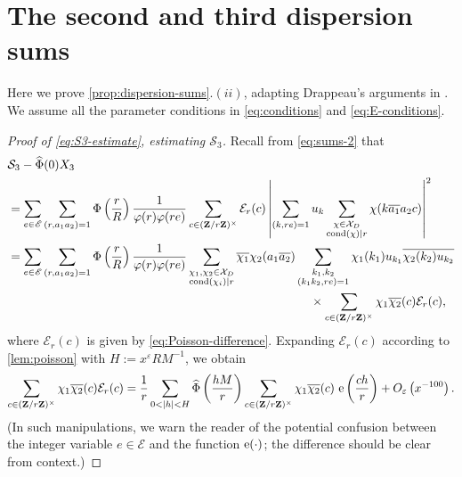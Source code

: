 \documentclass[reqno,11pt]{amsart}
\theoremstyle{definition}
\theoremstyle{remark}
\numberwithin{equation}{section}
\newcommand{\Z}{\mathbf{Z}}
\newcommand{\msE}{\mathscr{E}}
\newcommand{\mE}{\mathcal{E}}
\newcommand{\mS}{\mathcal{S}}
\newcommand{\mX}{\mathcal{X}}
\newcommand{\e}{\textnormal{e}}
\newcommand{\eps}{\varepsilon}
\renewcommand{\bar}{\overline}
\renewcommand{\hat}{\widehat}
\newcommand{\cond}{\textnormal{cond}}
\begin{document}
\section{The second and third dispersion sums}

Here we prove \cref{prop:dispersion-sums}.$(ii)$, adapting Drappeau's arguments in \cite[\S 3.2-- 3.3]{drappeau2015theoremes}. We assume all the parameter conditions in \cref{eq:conditions} and \cref{eq:E-conditions}.

\begin{proof}[Proof of \cref{eq:S3-estimate}, estimating $\mS_3$]
Recall from \cref{eq:sums-2} that
\[
\begin{aligned}
    &\mS_3 - \hat{\Phi}(0) X_3 
    \\
    &= \sum_{e \in \msE} \sum_{(r,a_1a_2)=1} \Phi\left(\frac{r}{R}\right) \frac{1}{\varphi(r)\varphi(re)}  \sum_{c \in (\Z/r\Z)^\times} \mE_r(c) \left\vert \sum_{(k,re)=1} u_k \sum_{\substack{\chi \in \mX_D \\ \cond(\chi) \mid r}} \chi(k \bar{a_1}a_2 c)\right\vert^2
    \\
    &=
    \sum_{e \in \msE} \sum_{(r,a_1a_2)=1} \Phi\left(\frac{r}{R}\right) \frac{1}{\varphi(r)\varphi(re)} 
    \sum_{\substack{\chi_1, \chi_2 \in \mX_D \\ \cond(\chi_i) \mid r}}
    \bar{\chi_1} \chi_2 (a_1 \bar{a_2})
    \sum_{\substack{k_1, k_2 \\ (k_1k_2, re) = 1}} 
    \chi_1(k_1) u_{k_1} \bar{\chi_2(k_2) u_{k_2}} \\
    &
    \qquad\qquad\qquad\qquad\qquad\qquad\qquad\qquad\qquad\qquad\qquad\qquad\quad
    \times 
    \sum_{c \in (\Z/r\Z)^\times} \chi_1 \bar{\chi_2}(c) \mE_r(c),
\end{aligned}
\]
where $\mE_r(c)$ is given by \cref{eq:Poisson-difference}. Expanding $\mE_r(c)$ according to \cref{lem:poisson} with $H := x^\eps R M^{-1}$, we obtain
\begin{equation} \label{eq:Gauss}
    \sum_{c \in (\Z/r\Z)^\times} \chi_1 \bar{\chi_2}(c) \mE_r(c)
    =
    \frac{1}{r} \sum_{0 < |h| < H} \hat{\Phi}\left(\frac{hM}{r}\right) \sum_{c \in (\Z/r\Z)^\times} \chi_1 \bar{\chi_2}(c)\ \e\left(\frac{ch}{r}\right)
    + O_\eps\left(x^{-100}\right).
\end{equation}
(In such manipulations, we warn the reader of the potential confusion between the integer variable $e \in \msE$ and the function $\e(\cdot)$; the difference should be clear from context.)


\end{proof}
\end{document}
